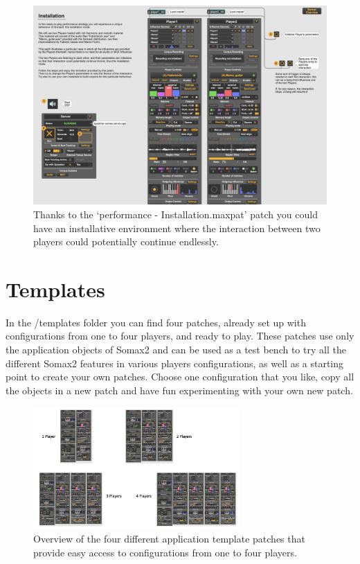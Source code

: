 \begin{figure}[H]
    \centering        
 	\includegraphics[width=1\textwidth]{img/installation.png}
    \caption{Thanks to the `performance - Installation.maxpat' patch you could have an installative environment where the interaction between two players could potentially continue endlessly.}
    \label{fig:installation}
\end{figure}


\section{Templates}
In the /templates folder you can find four patches, already set up with configurations from one to four players, and ready to play. These patches use only the application objects of Somax2 and can be used as a test bench to try all the different Somax2 features in various players configurations, as well as a starting point to create your own patches. Choose one configuration that you like, copy all the objects in a new patch and have fun experimenting with your own new patch.

 \begin{figure}[H]
    \centering        
 	\includegraphics[width=0.7\textwidth]{img/templates.png}
    \caption{Overview of the four different application template patches that provide easy access to configurations from one to four players.}
    \label{fig:templates}
\end{figure}

